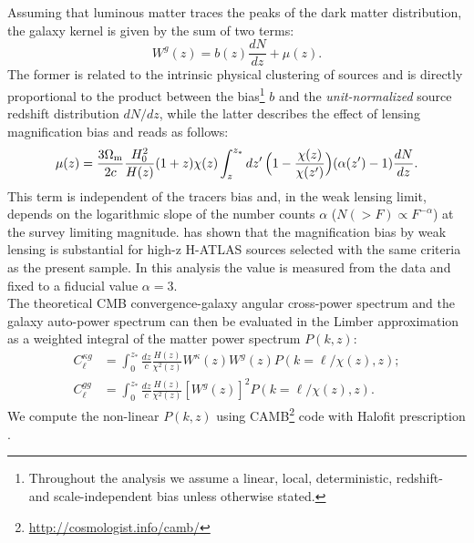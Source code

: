 \documentclass[prd,showpacs,amsfonts,amssymb,amsmath, nofootinbib]{revtex4-1}
\begin{document}
Assuming that luminous matter traces the peaks of the dark matter distribution, the galaxy kernel is given by the sum of two terms:
%
\begin{equation}
W^{g}(z) = b(z)\frac{dN}{dz} + \mu(z).
\label{eqn:wg}
\end{equation}
%
The former is related to the intrinsic physical clustering of sources
and is directly proportional to the product between the bias\footnote{Throughout the analysis we assume a linear, local,
  deterministic, redshift- and scale-independent bias unless otherwise
  stated.}
$b$ and the \emph{unit-normalized} source redshift distribution $dN/dz$, while the
latter describes the effect of lensing magnification bias
\citep{turner84,villumsen95,xia09} and reads as follows:
%
\begin{equation}
\label{eqn:wmu}
\mu(z) = \frac{3\Omega_{\rm m}}{2c}\frac{H_0^2}{H(z)}(1+z)\chi(z) \int_z^{z_*}dz'\,\Bigl(1-\frac{\chi(z)}{\chi(z')}\Bigr)(\alpha(z')-1)\frac{dN}{dz}.
\end{equation}
%
This term is independent of the
tracers bias and, in the weak lensing limit, depends on the
logarithmic slope of the number counts $\alpha$ ($N(>F)\propto
F^{-\alpha}$) at the survey limiting magnitude.  \cite{gonzalez-nuevo:2014} has shown that the magnification bias by weak lensing is substantial for high-z H-ATLAS sources selected with the same criteria as the present sample. In this analysis the value is measured from the data and fixed to a fiducial value
$\alpha=3$.\\
The theoretical CMB convergence-galaxy angular cross-power spectrum and the galaxy auto-power spectrum can then be evaluated in the Limber approximation \citep{limber} as a weighted integral of the matter power spectrum $P(k,z)$:
%
\begin{equation}
\begin{split}
C_{\ell}^{\kappa g} &=   \int_0^{z_*} \frac{dz}{c} \frac{H(z)}{\chi^2(z)} W^{\kappa}(z)W^{g}(z)P(k=\ell/\chi(z),z); \\
C_{\ell}^{gg} &=   \int_0^{z_*} \frac{dz}{c} \frac{H(z)}{\chi^2(z)} [W^{g}(z)]^2P(k=\ell/\chi(z),z).
\end{split}
\end{equation}
%
We compute the non-linear $P(k,z)$ using CAMB\footnote{\url{http://cosmologist.info/camb/}} code with Halofit prescription \citep{camb,halofit}. \\
\end{document}
